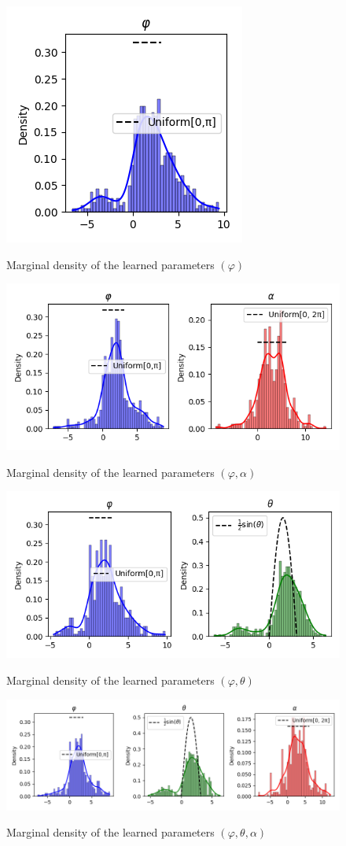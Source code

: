 \documentclass[a4paper,12pt]{article}
\theoremstyle{definition}
\begin{document}
\begin{figure}[H]
    \centering
    \includegraphics[height=0.35\textwidth]{VariableSelection/phi.png}
    \label{fig:Distributions4.4}
    \caption{Marginal density of the learned parameters \((\varphi)\)}
\end{figure}
\begin{figure}[H]
    \centering
    \includegraphics[height=0.35\textwidth]{VariableSelection/phi_alpha.png}
    \label{fig:Distributions4.5}
    \caption{Marginal density of the learned parameters \((\varphi,\alpha)\)}
\end{figure}
\begin{figure}[H]
    \centering
    \includegraphics[height=0.35\textwidth]{VariableSelection/phi_theta.png}
    \label{fig:Distributions4.6}
    \caption{Marginal density of the learned parameters \((\varphi,\theta)\)}
\end{figure}
\begin{figure}[H]
    \centering
    \includegraphics[height=0.35\textwidth]{VariableSelection/phi_theta_alpha.png}
    \label{fig:Distributions4.7}
    \caption{Marginal density of the learned parameters \((\varphi,\theta,\alpha)\)}
\end{figure}
\end{document}
